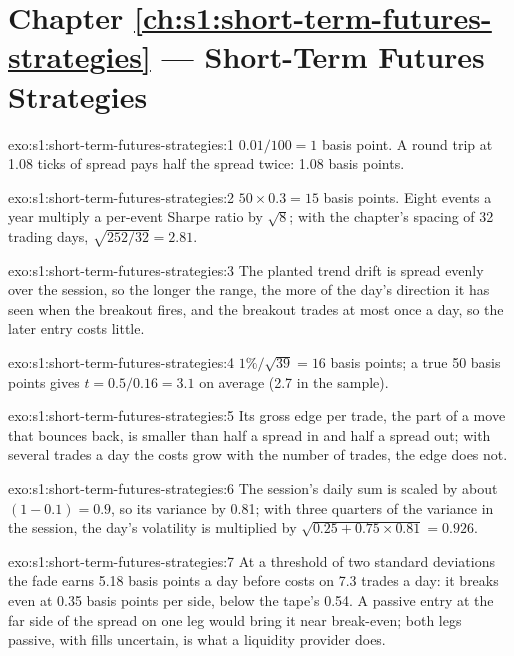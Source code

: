\section*{Chapter \ref{ch:s1:short-term-futures-strategies} --- Short-Term Futures Strategies}

\begin{solution}{exo:s1:short-term-futures-strategies:1}
$0.01/100 = 1$ basis point. A round trip at 1.08 ticks of spread pays half the spread twice: 1.08 basis points.
\end{solution}

\begin{solution}{exo:s1:short-term-futures-strategies:2}
$50 \times 0.3 = 15$ basis points. Eight events a year multiply a per-event Sharpe ratio by $\sqrt{8}$; with the chapter's spacing of 32 trading days,
$\sqrt{252/32} = 2.81$.
\end{solution}

\begin{solution}{exo:s1:short-term-futures-strategies:3}
The planted trend drift is spread evenly over the session, so the longer the range, the more of the day's direction it has seen when the breakout
fires, and the breakout trades at most once a day, so the later entry costs little.
\end{solution}

\begin{solution}{exo:s1:short-term-futures-strategies:4}
$1\%/\sqrt{39} = 16$ basis points; a true 50 basis points gives $t = 0.5/0.16 = 3.1$ on average (2.7 in the sample).
\end{solution}

\begin{solution}{exo:s1:short-term-futures-strategies:5}
Its gross edge per trade, the part of a move that bounces back, is smaller than half a spread in and half a spread out; with several trades a day the
costs grow with the number of trades, the edge does not.
\end{solution}

\begin{solution}{exo:s1:short-term-futures-strategies:6}
The session's daily sum is scaled by about $(1 - 0.1) = 0.9$, so its variance by 0.81; with three quarters of the variance in the session, the day's
volatility is multiplied by $\sqrt{0.25 + 0.75 \times 0.81} = 0.926$.
\end{solution}

\begin{solution}{exo:s1:short-term-futures-strategies:7}
At a threshold of two standard deviations the fade earns 5.18 basis points a day before costs on 7.3 trades a day: it breaks even at 0.35 basis points
per side, below the tape's 0.54. A passive entry at the far side of the spread on one leg would bring it near break-even; both legs passive, with fills
uncertain, is what a liquidity provider does.
\end{solution}

